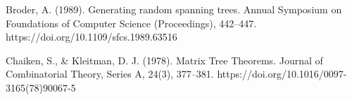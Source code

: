 \begin{thebibliography}{9}
    
Broder, A. (1989). Generating random spanning trees. Annual Symposium on Foundations of Computer Science (Proceedings), 442–447. https://doi.org/10.1109/sfcs.1989.63516

Chaiken, S., \& Kleitman, D. J. (1978). Matrix Tree Theorems. Journal of Combinatorial Theory, Series A, 24(3), 377–381. https://doi.org/10.1016/0097-3165(78)90067-5


\end{thebibliography}